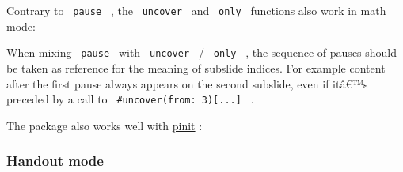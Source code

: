 Contrary to \texttt{\ pause\ } , the \texttt{\ uncover\ } and
\texttt{\ only\ } functions also work in math mode:

\begin{Shaded}
\begin{Highlighting}[]
\NormalTok{\#slide[}

\NormalTok{  $}
\NormalTok{  $}
\NormalTok{]}
\end{Highlighting}
\end{Shaded}

When mixing \texttt{\ pause\ } with \texttt{\ uncover\ } /
\texttt{\ only\ } , the sequence of pauses should be taken as reference
for the meaning of subslide indices. For example content after the first
pause always appears on the second subslide, even if itâ€™s preceded by
a call to \texttt{\ \#uncover(from:\ 3){[}...{]}\ } .

The package also works well with
\href{https://typst.app/universe/package/pinit}{pinit} :

\begin{Shaded}
\begin{Highlighting}[]

\NormalTok{\#slide[}





\NormalTok{  \})}



\NormalTok{]}
\end{Highlighting}
\end{Shaded}

\subsubsection{Handout mode}\label{handout-mode}

